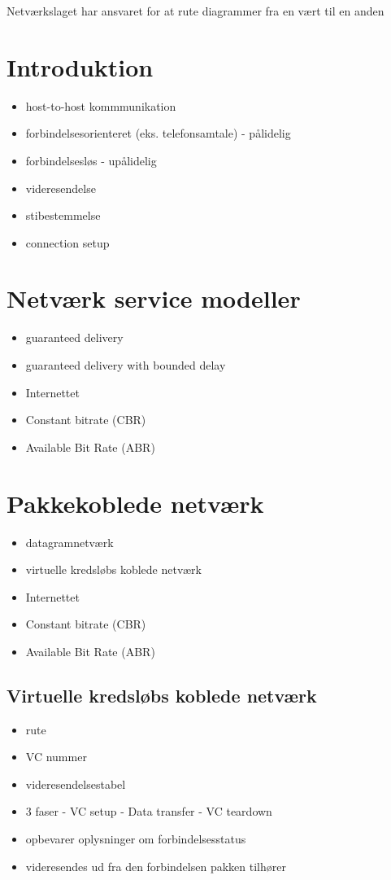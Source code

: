 Netværkslaget har ansvaret for at rute diagrammer fra en vært til en anden

\section{Introduktion}
\begin{itemize}
	\item host-to-host kommmunikation
	\item forbindelsesorienteret (eks. telefonsamtale) - pålidelig
	\item forbindelsesløs - upålidelig
	\item videresendelse
	\item stibestemmelse
	\item connection setup
\end{itemize}

\section{Netværk service modeller}
\begin{itemize}
	\item guaranteed delivery
	\item guaranteed delivery with bounded delay
	\item Internettet
	\item Constant bitrate (CBR)
	\item Available Bit Rate (ABR)
\end{itemize}

\section{Pakkekoblede netværk}
\begin{itemize}
	\item datagramnetværk 
	\item virtuelle kredsløbs koblede netværk
	\item Internettet
	\item Constant bitrate (CBR)
	\item Available Bit Rate (ABR)
\end{itemize}

\subsection{Virtuelle kredsløbs koblede netværk}
\begin{itemize}
	\item rute 
	\item VC nummer
	\item videresendelsestabel
	\item 3 faser - VC setup - Data transfer - VC teardown
	\item opbevarer oplysninger om forbindelsesstatus
	\item videresendes ud fra den forbindelsen pakken tilhører
\end{itemize}

